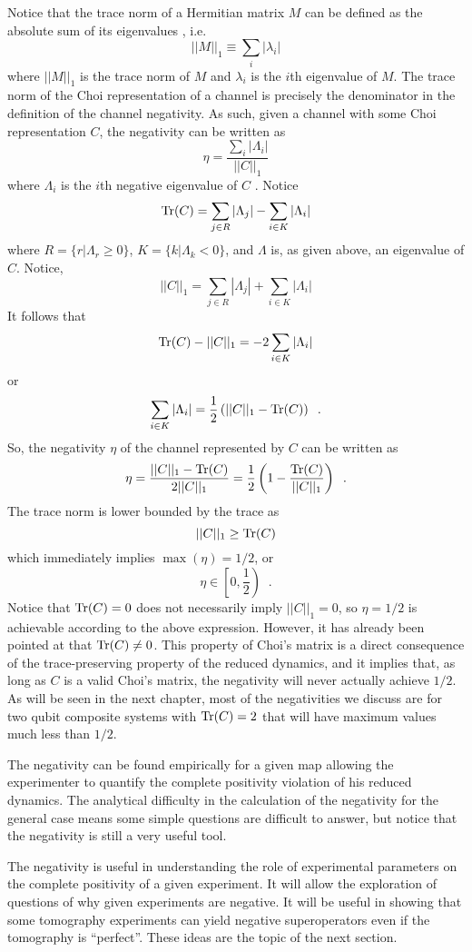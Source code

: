 Notice that the trace norm of a Hermitian matrix $M$ can be defined as the absolute sum of its eigenvalues \cite{Wilde2013}, i.e.\
$$
||M||_1 \equiv \sum_i |\lambda_i|
$$
where $||M||_1$ is the trace norm of $M$ and $\lambda_i$ is the $i$th eigenvalue of $M$.  The trace norm of the Choi representation of a channel is precisely the denominator in the definition of the channel negativity.  As such, given a channel with some Choi representation $C$, the negativity can be written as
$$
\eta = \frac{\sum_i |\Lambda_i|}{||C||_1}
$$
where $\Lambda_i$ is the $i$th negative eigenvalue of $C$ .  Notice
$$
\operatorname{Tr}(C) = \sum_{j\in R} |\Lambda_j| - \sum_{i\in K} |\Lambda_i|
$$
where $R = \{r|\Lambda_r\ge 0\}$, $K = \{k|\Lambda_k < 0\}$, and $\Lambda$ is, as given above, an eigenvalue of $C$.  Notice,
$$
||C||_1 = \sum_{j\in R} |\Lambda_j| + \sum_{i\in K} |\Lambda_i|
$$
It follows that
$$
\operatorname{Tr}(C) - ||C||_1 = -2\sum_{i\in K} |\Lambda_i|
$$
or
$$
\sum_{i\in K} |\Lambda_i| = \frac{1}{2}\left(||C||_1 - \operatorname{Tr}(C)\right)\;\;.
$$  
So, the negativity $\eta$ of the channel represented by $C$ can be written as
$$
\eta = \frac{||C||_1-\operatorname{Tr}(C)}{2||C||_1} = \frac{1}{2}\left(1-\frac{\operatorname{Tr}(C)}{||C||_1}\right)\;\;.
$$
The trace norm is lower bounded by the trace as
$$
||C||_1 \ge \operatorname{Tr}(C)
$$
which immediately implies $\max(\eta) = 1/2$, or 
$$
\eta\in\left[0,\frac{1}{2}\right)\;\;.
$$
Notice that $\operatorname{Tr}(C)=0$ does not necessarily imply $||C||_1=0$, so $\eta=1/2$ is achievable according to the above expression.  However, it has already been pointed at that $\operatorname{Tr}(C)\neq 0$.  This property of Choi's matrix is a direct consequence of the trace-preserving property of the reduced dynamics, and it implies that, as long as $C$ is a valid Choi's matrix, the negativity will never actually achieve $1/2$.  As will be seen in the next chapter, most of the negativities we discuss are for two qubit composite systems with $\operatorname{Tr}(C)=2$ that will have maximum values much less than $1/2$.

The negativity can be found empirically for a given map allowing the experimenter to quantify the complete positivity violation of his reduced dynamics.  The analytical difficulty in the calculation of the negativity for the general case means some simple questions are difficult to answer, but notice that the negativity is still a very useful tool.

The negativity is useful in understanding the role of experimental parameters on the complete positivity of a given experiment.  It will allow the exploration of questions of why given experiments are negative.  It will be useful in showing that some tomography experiments can yield negative superoperators even if the tomography is ``perfect''.  These ideas are the topic of the next section.

